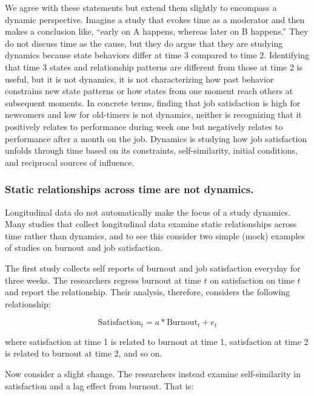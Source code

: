 \documentclass[english,,man]{apa6}
\theoremstyle{definition}
\theoremstyle{definition}
\theoremstyle{definition}
\theoremstyle{remark}
\begin{document}
We agree with these statements but extend them slightly to encompass a
dynamic perspective. Imagine a study that evokes time as a moderator and
then makes a conclusion like, \enquote{early on A happens, whereas later
on B happens.} They do not discuss time as the cause, but they do argue
that they are studying dynamics because state behaviors differ at time 3
compared to time 2. Identifying that time 3 states and relationship
patterns are different from those at time 2 is useful, but it is not
dynamics, it is not characterizing how past behavior constrains new
state patterns or how states from one moment reach others at subsequent
moments. In concrete terms, finding that job satisfaction is high for
newcomers and low for old-timers is not dynamics, neither is recognizing
that it positively relates to performance during week one but negatively
relates to performance after a month on the job. Dynamics is studying
how job satisfaction unfolds through time based on its constraints,
self-similarity, initial conditions, and reciprocal sources of
influence.

\hypertarget{static-relationships-across-time-are-not-dynamics.}{%
\subsubsection{Static relationships across time are not
dynamics.}\label{static-relationships-across-time-are-not-dynamics.}}

Longitudinal data do not automatically make the focus of a study
dynamics. Many studies that collect longitudinal data examine static
relationships across time rather than dynamics, and to see this consider
two simple (mock) examples of studies on burnout and job satisfaction.

The first study collects self reports of burnout and job satisfaction
everyday for three weeks. The researchers regress burnout at time \(t\)
on satisfaction on time \(t\) and report the relationship. Their
analysis, therefore, considers the following relationship:

\begin{equation}
\textrm{Satisfaction}_{t} = a * \textrm{Burnout}_{t} + e_{t}
\end{equation}

\noindent where satisfaction at time 1 is related to burnout at time 1,
satisfaction at time 2 is related to burnout at time 2, and so on.

Now consider a slight change. The researchers instead examine
self-similarity in satisfaction and a lag effect from burnout. That is:
\end{document}
